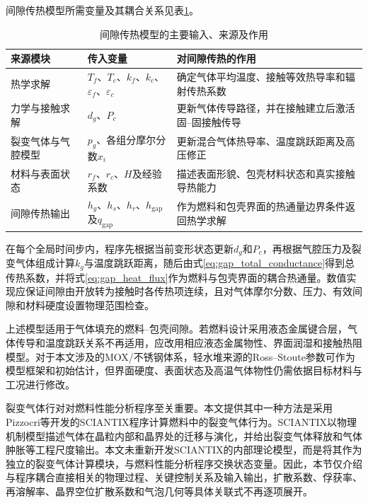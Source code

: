 
间隙传热模型所需变量及其耦合关系见表\ref{tab:gap_heat_transfer_coupling}。

\begin{table}[htbp]
	\centering
	\small
	\renewcommand{\arraystretch}{1.18}
	\caption{间隙传热模型的主要输入、来源及作用}
	\label{tab:gap_heat_transfer_coupling}
	\begin{tabularx}{\textwidth}{p{2.7cm}p{4cm}X}
		\toprule
		来源模块 & 传入变量 & 对间隙传热的作用 \\
		\midrule
		热学求解 & $T_f$、$T_c$、$k_f$、$k_c$、$\varepsilon_f$、$\varepsilon_c$
		& 确定气体平均温度、接触等效热导率和辐射传热系数 \\
		力学与接触求解 & $d_g$、$P_c$
		& 更新气体传导路径，并在接触建立后激活固--固接触传导 \\
		裂变气体与气腔模型 & $p_g$、各组分摩尔分数$x_i$
		& 更新混合气体热导率、温度跳跃距离及高压修正 \\
		材料与表面状态 & $r_f$、$r_c$、$H$及经验系数
		& 描述表面形貌、包壳材料状态和真实接触导热能力 \\
		间隙传热输出 & $h_g$、$h_s$、$h_r$、$h_{\mathrm{gap}}$及$q_{\mathrm{gap}}$
		& 作为燃料和包壳界面的热通量边界条件返回热学求解 \\
		\bottomrule
	\end{tabularx}
\end{table}

在每个全局时间步内，程序先根据当前变形状态更新$d_g$和$P_c$，再根据气腔压力及裂变气体组成计算$k_g$与温度跳跃距离，随后由式\eqref{eq:gap_total_conductance}得到总传热系数，并将式\eqref{eq:gap_heat_flux}作为燃料与包壳界面的耦合热通量。数值实现应保证间隙由开放转为接触时各传热项连续，且对气体摩尔分数、压力、有效间隙和材料硬度设置物理范围检查。

上述模型适用于气体填充的燃料--包壳间隙。若燃料设计采用液态金属键合层，气体传导和温度跳跃关系不再适用，应改用相应液态金属物性、界面润湿和接触热阻模型。对于本文涉及的MOX/不锈钢体系，轻水堆来源的Ross--Stoute参数可作为模型框架和初始估计，但界面硬度、表面状态及高温气体物性仍需依据目标材料与工况进行修改。

\label{sec:sciantix_fission_gas_model}


裂变气体行对对燃料性能分析程序至关重要。本文提供其中一种方法是采用Pizzocri等开发的SCIANTIX程序计算燃料中的裂变气体行为\cite{pizzocriSCIANTIXNewOpen2020}。SCIANTIX以物理机制模型描述气体在晶粒内部和晶界处的迁移与演化，并给出裂变气体释放和气体肿胀等工程尺度输出。本文未重新开发SCIANTIX的内部理论模型，而是将其作为独立的裂变气体计算模块，与燃料性能分析程序交换状态变量。因此，本节仅介绍与程序耦合直接相关的物理过程、关键控制关系及输入输出，扩散系数、俘获率、再溶解率、晶界空位扩散系数和气泡几何等具体关联式不再逐项展开。


